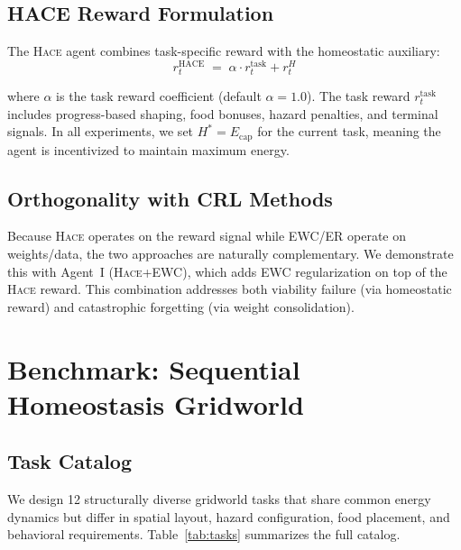 \documentclass{article}
\newcommand{\setpoint}{H^*}
\newcommand{\energy}{E}
\newcommand{\rwd}{r}
\newcommand{\hace}{\textsc{Hace}}
\begin{document}
\subsection{HACE Reward Formulation}

The \hace{} agent combines task-specific reward with the homeostatic
auxiliary:
\begin{equation}
  \rwd_t^{\mathrm{HACE}} \;=\;
    \alpha \cdot \rwd_t^{\mathrm{task}} + \rwd_t^H
  \label{eq:hace}
\end{equation}

where $\alpha$ is the task reward coefficient (default $\alpha = 1.0$).
The task reward $\rwd_t^{\mathrm{task}}$ includes progress-based shaping,
food bonuses, hazard penalties, and terminal signals. In all experiments,
we set $\setpoint = \energy_{\mathrm{cap}}$ for the current task, meaning
the agent is incentivized to maintain maximum energy.

\subsection{Orthogonality with CRL Methods}

Because \hace{} operates on the reward signal while EWC/ER operate on
weights/data, the two approaches are naturally complementary. We
demonstrate this with Agent~I (\hace{}+EWC), which adds EWC
regularization on top of the \hace{} reward. This combination addresses
both viability failure (via homeostatic reward) and catastrophic
forgetting (via weight consolidation).

\section{Benchmark: Sequential Homeostasis Gridworld}
\label{sec:benchmark}

\subsection{Task Catalog}

We design 12 structurally diverse gridworld tasks that share common
energy dynamics but differ in spatial layout, hazard configuration,
food placement, and behavioral requirements. Table~\ref{tab:tasks}
summarizes the full catalog.
\end{document}

